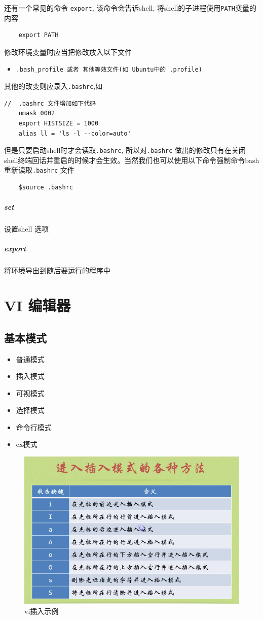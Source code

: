 \documentclass[UTF8,a4paper,12pt]{ctexbook}
\begin{document}
			还有一个常见的命令 \verb|export|, 该命令会告诉shell, 将shell的子进程使用\verb|PATH|变量的内容
			\begin{lstlisting}
	export PATH
			\end{lstlisting}
			
			修改环境变量时应当把修改放入以下文件
			\begin{itemize}[itemindent = 1em]
				\item \verb|.bash_profile 或者 其他等效文件(如 Ubuntu中的 .profile)|
			\end{itemize}
			
			其他的改变则应录入\verb|.bashrc|,如
			\begin{lstlisting}
//  .bashrc 文件增加如下代码
	umask 0002
	export HISTSIZE = 1000
	alias ll = 'ls -l --color=auto'
			\end{lstlisting}
			
			但是只要启动shell时才会读取\verb|.bashrc|, 所以对\verb|.bashrc| 做出的修改只有在关闭shell终端回话并重启的时候才会生效。当然我们也可以使用以下命令强制命令bash 重新读取\verb|.bashrc| 文件
			
			\begin{lstlisting}
	$source .bashrc
			\end{lstlisting}
		\subparagraph{set}设置shell 选项
		\subparagraph{export}将环境导出到随后要运行的程序中
		
	\section{VI 编辑器}
		\subsection{基本模式}
			\begin{itemize}
				\item 普通模式
				\item 插入模式
				\item 可视模式
				\item 选择模式
				\item 命令行模式
				\item ex模式
			\end{itemize}
			\begin{figure}[h]
				\centering
				\includegraphics[scale = 0.5]{figure/viInsert.png}
				\caption{vi插入示例}
			\end{figure}
\end{document}
